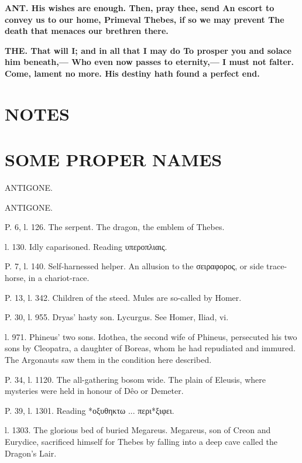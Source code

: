 \documentclass[11pt,letter]{book}
\begin{document}
\par \textbf{ANT. His wishes are enough. Then, pray thee, send An escort to convey us to our home, Primeval Thebes, if so we may prevent The death that menaces our brethren there.}
\par 

\par \textbf{THE. That will I; and in all that I may do To prosper you and solace him beneath,— Who even now passes to eternity,— I must not falter. Come, lament no more. His destiny hath found a perfect end.}
\par 
\section{NOTES}\section{SOME PROPER NAMES}
\par  ANTIGONE.

\par  ANTIGONE.

\par  P. 6, l. 126. The serpent. The dragon, the emblem of Thebes.

\par  l. 130. Idly caparisoned. Reading υπεροπλιαις.

\par  P. 7, l. 140. Self-harnessed helper. An allusion to the σειραφορος, or side trace-horse, in a chariot-race.

\par  P. 13, l. 342. Children of the steed. Mules are so-called by Homer.

\par  P. 30, l. 955. Dryas’ hasty son. Lycurgus. See Homer, Iliad, vi.

\par  l. 971. Phineus’ two sons. Idothea, the second wife of Phineus, persecuted his two sons by Cleopatra, a daughter of Boreas, whom he had repudiated and immured. The Argonauts saw them in the condition here described.

\par  P. 34, l. 1120. The all-gathering bosom wide. The plain of Eleusis, where mysteries were held in honour of Dêo or Demeter.

\par  P. 39, l. 1301. Reading *οξυθηκτω ... περι*ξιφει.

\par  l. 1303. The glorious bed of buried Megareus. Megareus, son of Creon and Eurydice, sacrificed himself for Thebes by falling into a deep cave called the Dragon’s Lair.
\end{document}
